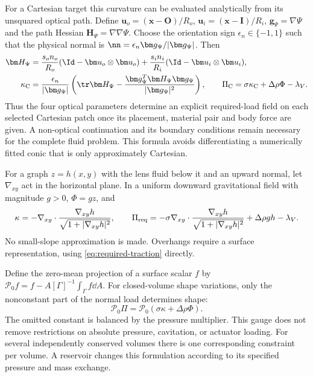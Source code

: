 For a Cartesian target this curvature can be evaluated analytically from its
unsquared optical path. Define $\bm u_o=(\bm x-\bm O)/R_o$,
$\bm u_i=(\bm x-\bm I)/R_i$, $\bm g_\Psi=\nabla\Psi$ and the path Hessian
$\bm H_\Psi=\nabla\nabla\Psi$. Choose the orientation sign
$\epsilon_n\in\{-1,1\}$ such that the physical normal is
$\nn=\epsilon_n\bm g_\Psi/|\bm g_\Psi|$. Then
\begin{align}
 \bm H_\Psi&=\frac{s_on_o}{R_o}(\Id-\bm u_o\otimes\bm u_o)
            +\frac{s_in_i}{R_i}(\Id-\bm u_i\otimes\bm u_i),\\
 \kappa_{\rm C}&=\frac{\epsilon_n}{|\bm g_\Psi|}
 \left(\tr\bm H_\Psi-
       \frac{\bm g_\Psi^T\bm H_\Psi\bm g_\Psi}{|\bm g_\Psi|^2}\right),
 \qquad
 \Pi_{\rm C}=\sigma\kappa_{\rm C}+\Delta\rho\Phi-\lambda_V.
 \label{eq:cartesian-traction-explicit}
\end{align}
Thus the four optical parameters determine an explicit required-load field on
each selected Cartesian patch once its placement, material pair and body
force are given. A non-optical continuation and its boundary conditions remain
necessary for the complete fluid problem. This formula avoids differentiating
a numerically fitted conic that is only approximately Cartesian.

For a graph $z=h(x,y)$ with the lens fluid below it and an upward normal, let
$\nabla_{xy}$ act in the horizontal plane. In a uniform downward gravitational
field with magnitude $g>0$, $\Phi=gz$, and
\begin{equation}
 \kappa=-\nabla_{xy}\cdot
       \frac{\nabla_{xy}h}{\sqrt{1+|\nabla_{xy}h|^2}},\qquad
 \Pi_{\rm req}=-\sigma\nabla_{xy}\cdot
       \frac{\nabla_{xy}h}{\sqrt{1+|\nabla_{xy}h|^2}}
       +\Delta\rho gh-\lambda_V.
 \label{eq:graph-traction}
\end{equation}
No small-slope approximation is made. Overhangs require a surface
representation, using \cref{eq:required-traction} directly.

Define the zero-mean projection of a surface scalar $f$ by
$\mathcal P_0f=f-A[\Gamma]^{-1}\int_\Gamma f\dd A$. For closed-volume shape
variations, only the nonconstant part of the normal load determines shape:
\begin{equation}
 \mathcal P_0\Pi=\mathcal P_0(\sigma\kappa+\Delta\rho\Phi).
 \label{eq:pressure-gauge}
\end{equation}
The omitted constant is balanced by the pressure multiplier. This gauge does
not remove restrictions on absolute pressure, cavitation, or actuator loading.
For several independently conserved volumes there is one corresponding
constraint per volume. A reservoir changes this formulation according to its
specified pressure and mass exchange.

